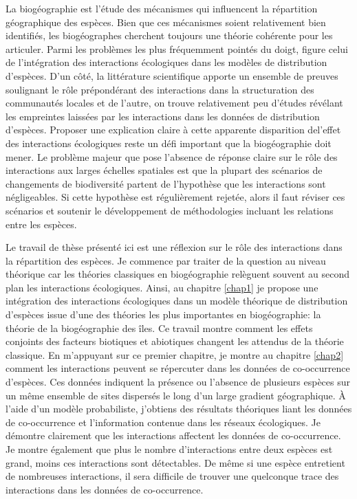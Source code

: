 La biogéographie est l'étude des mécanismes qui influencent la
répartition géographique des espèces. Bien que ces mécanismes soient
relativement bien identifiés, les biogéographes cherchent toujours une
théorie cohérente pour les articuler. Parmi les problèmes les plus
fréquemment pointés du doigt, figure celui de l'intégration des
interactions écologiques dans les modèles de distribution d'espèces.
D'un côté, la littérature scientifique apporte un ensemble de preuves
soulignant le rôle prépondérant des interactions dans la structuration
des communautés locales et de l'autre, on trouve relativement peu
d'études révélant les empreintes laissées par les interactions dans les
données de distribution d'espèces. Proposer une explication claire à
cette apparente disparition del'effet des interactions écologiques reste
un défi important que la biogéographie doit mener. Le problème majeur
que pose l'absence de réponse claire sur le rôle des interactions aux
larges échelles spatiales est que la plupart des scénarios de
changements de biodiversité partent de l'hypothèse que les interactions
sont négligeables. Si cette hypothèse est régulièrement rejetée, alors
il faut réviser ces scénarios et soutenir le développement de
méthodologies incluant les relations entre les espèces.

Le travail de thèse présenté ici est une réflexion sur le rôle des
interactions dans la répartition des espèces. Je commence par traiter de
la question au niveau théorique car les théories classiques en
biogéographie relèguent souvent au second plan les interactions
écologiques. Ainsi, au chapitre \ref{chap1} je propose une intégration
des interactions écologiques dans un modèle théorique de distribution
d'espèces issue d'une des théories les plus importantes en
biogéographie: la théorie de la biogéographie des îles. Ce travail
montre comment les effets conjoints des facteurs biotiques et abiotiques
changent les attendus de la théorie classique. En m'appuyant sur ce
premier chapitre, je montre au chapitre \ref{chap2} comment les
interactions peuvent se répercuter dans les données de co-occurrence
d'espèces. Ces données indiquent la présence ou l'absence de plusieurs
espèces sur un même ensemble de sites dispersés le long d'un large
gradient géographique. À l'aide d'un modèle probabiliste, j'obtiens des
résultats théoriques liant les données de co-occurrence et l'information
contenue dans les réseaux écologiques. Je démontre clairement que les
interactions affectent les données de co-occurrence. Je montre également
que plus le nombre d'interactions entre deux espèces est grand, moins
ces interactions sont détectables. De même si une espèce entretient de
nombreuses interactions, il sera difficile de trouver une quelconque
trace des interactions dans les données de co-occurrence.

